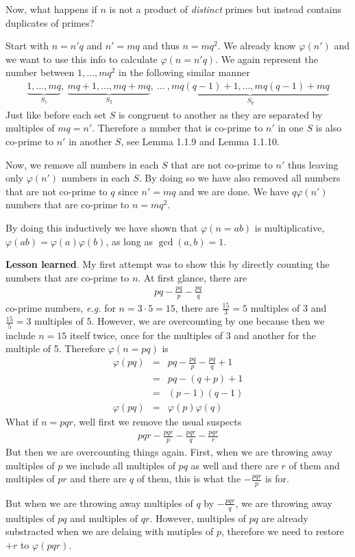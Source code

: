 \documentclass[aps,preprint,preprintnumbers,nofootinbib,showpacs,prd]{revtex4-1}
\newcommand{\eg}{{\it e.g.} }
\newcommand{\nbea}{\begin{eqnarray*}}
\newcommand{\neea}{\end{eqnarray*}}
\begin{document}
Now, what happens if $n$ is not a product of {\it distinct} primes but instead contains duplicates of primes? 

Start with $n = n' q$ and $n' = m q$ and thus $n = m q^2$. We already know $\varphi(n')$ and we want to use this info to calculate $\varphi(n = n'q)$. We again represent the number between $1, \dots, mq^2$ in the following similar manner
%
\nbea
\underbrace{1, \dots, mq}_\text{$S_1$}, ~ \underbrace{mq+1, \dots, mq+mq}_\text{$S_2$}, ~ \dots~, \underbrace{mq(q-1) + 1, \dots, mq(q-1) + mq}_\text{$S_q$}
\neea
%
Just like before each set $S$ is congruent to another as they are separated by multiples of $mq = n'$. Therefore a number that is co-prime to $n'$ in one $S$ is also co-prime to $n'$ in another $S$, see Lemma 1.1.9 and Lemma 1.1.10.

Now, we remove all numbers in each $S$ that are not co-prime to $n'$ thus leaving only $\varphi(n')$ numbers in each $S$. By doing so we have also removed all numbers that are not co-prime to $q$ since $n'=mq$ and we are done. We have $q\varphi(n')$ numbers that are co-prime to $n = mq^2$.

By doing this inductively we have shown that $\varphi(n=ab)$ is multiplicative, $\varphi(ab) = \varphi(a)\varphi(b)$, as long as $\gcd(a,b) = 1$.

{\bf Lesson learned}. My first attempt was to show this by directly counting the numbers that are co-prime to $n$. At first glance, there are
%
\nbea
pq - \frac{pq}{p} - \frac{pq}{q}
\neea
%
co-prime numbers, \eg for $n=3\cdot 5 = 15$, there are $\frac{15}{3} = 5$ multiples of $3$ and $\frac{15}{5} = 3$ multiples of 5. However, we are overcounting by one because then we include $n=15$ itself twice, once for the multiples of 3 and another for the multiple of 5. Therefore $\varphi(n=pq)$ is
%
\nbea
\varphi(pq) & = & pq - \frac{pq}{p} - \frac{pq}{q} + 1 \\
& = & pq - (q+p) + 1 \\
& = & (p-1)(q-1) \\
\varphi(pq) & = & \varphi(p)\varphi(q)
\neea
%
What if $n = pqr$, well first we remove the usual suspects
%
\nbea
pqr - \frac{pqr}{p} - \frac{pqr}{q} - \frac{pqr}{r}
\neea
%
But then we are overcounting things again. First, when we are throwing away multiples of $p$ we include all multiples of $pq$ as well and there are $r$ of them and multiples of $pr$ and there are $q$ of them, this is what the $ - \frac{pqr}{p}$ is for.

But when we are throwing away multiples of $q$ by $- \frac{pqr}{q}$, we are throwing away multiples of $pq$ and multiples of $qr$. However, multiples of $pq$ are already substracted when we are delaing with mutiples of $p$, therefore we need to restore $ + r$ to $\varphi(pqr)$.
\end{document}
